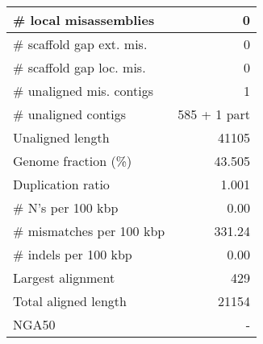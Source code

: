 \documentclass[12pt,a4paper]{article}
\begin{document}
\begin{table}[ht]
\begin{center}
\begin{tabular}{|l*{1}{|r}|}
\# local misassemblies & 0 \\ \hline
\# scaffold gap ext. mis. & 0 \\ \hline
\# scaffold gap loc. mis. & 0 \\ \hline
\# unaligned mis. contigs & 1 \\ \hline
\# unaligned contigs & 585 + 1 part \\ \hline
Unaligned length & 41105 \\ \hline
Genome fraction (\%) & 43.505 \\ \hline
Duplication ratio & 1.001 \\ \hline
\# N's per 100 kbp & 0.00 \\ \hline
\# mismatches per 100 kbp & 331.24 \\ \hline
\# indels per 100 kbp & 0.00 \\ \hline
Largest alignment & 429 \\ \hline
Total aligned length & 21154 \\ \hline
NGA50 & - \\ \hline
\end{tabular}
\end{center}
\end{table}
\end{document}
